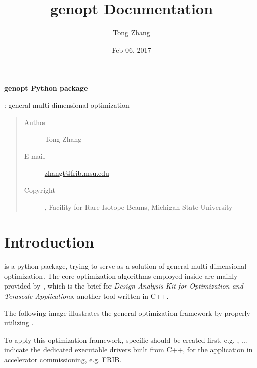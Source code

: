 \documentclass[letterpaper,10pt,english]{sphinxmanual}
\title{genopt Documentation}
\date{Feb 06, 2017}
\author{Tong Zhang}
\begin{document}
\maketitle
\tableofcontents
{}\label{index::doc}


\begin{sphinxShadowBox}
\textbf{genopt Python package}

\medskip


: general multi-dimensional optimization
\begin{quote}\begin{description}
\item[{Author}] \leavevmode
Tong Zhang

\item[{E-mail}] \leavevmode
\href{mailto:zhangt@frib.msu.edu}{zhangt@frib.msu.edu}

\item[{Copyright}] , Facility for Rare Isotope Beams, Michigan State University

\end{description}\end{quote}
\end{sphinxShadowBox}


\chapter{Introduction}
\label{src/intro:introduction}\label{src/intro::doc}\label{src/intro:welcome-to-genopt-s-documentation}
 is a python package, trying to serve as a solution of general
multi-dimensional optimization. The core optimization algorithms employed
inside are mainly provided by , which is the brief for
\emph{Design Analysis Kit for Optimization and Terascale Applications},
another tool written in C++.

The following image illustrates the general optimization framework
by properly utilizing .


To apply this optimization framework, specific  should
be created first, e.g. , ... indicate the
dedicated executable drivers built from C++, for the application in
accelerator commissioning, e.g. FRIB.
\end{document}
